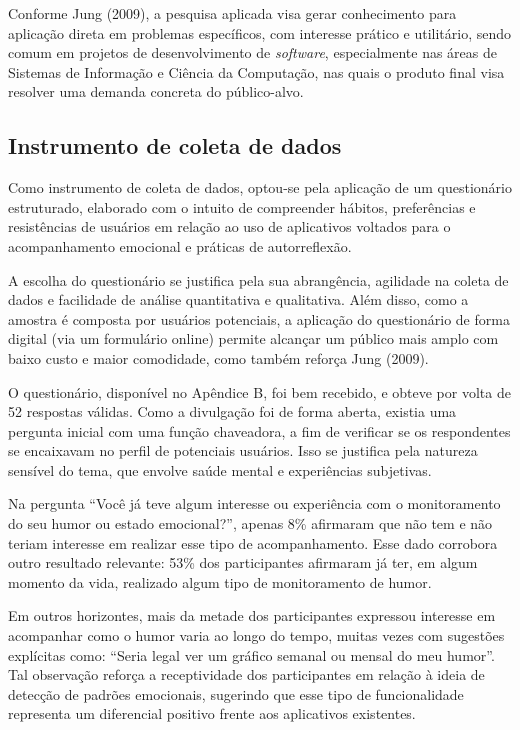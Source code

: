Conforme Jung (2009), a pesquisa aplicada visa gerar conhecimento para
aplicação direta em problemas específicos, com interesse prático e utilitário,
sendo comum em projetos de desenvolvimento de \textit{software}, especialmente
nas áreas de Sistemas de Informação e Ciência da Computação, nas quais o
produto final visa resolver uma demanda concreta do público-alvo.

\subsection{Instrumento de coleta de dados}

Como instrumento de coleta de dados, optou-se pela aplicação de um questionário
estruturado, elaborado com o intuito de compreender hábitos, preferências e
resistências de usuários em relação ao uso de aplicativos voltados para o
acompanhamento emocional e práticas de autorreflexão.

A escolha do questionário se justifica pela sua abrangência, agilidade na
coleta de dados e facilidade de análise quantitativa e qualitativa. Além disso,
como a amostra é composta por usuários potenciais, a aplicação do questionário
de forma digital (via um formulário online) permite alcançar um público mais
amplo com baixo custo e maior comodidade, como também reforça Jung (2009).

O questionário, disponível no Apêndice B, foi bem recebido, e obteve por volta
de 52 respostas válidas. Como a divulgação foi de forma aberta, existia uma
pergunta inicial com uma função chaveadora, a fim de verificar se os
respondentes se encaixavam no perfil de potenciais usuários. Isso se justifica
pela natureza sensível do tema, que envolve saúde mental e experiências
subjetivas.

Na pergunta ``Você já teve algum interesse ou experiência com o monitoramento do
seu humor ou estado emocional?'', apenas 8\% afirmaram que não tem e não teriam
interesse em realizar esse tipo de acompanhamento. Esse dado corrobora outro
resultado relevante: 53\% dos participantes afirmaram já ter, em algum momento
da vida, realizado algum tipo de monitoramento de humor.

Em outros horizontes, mais da metade dos participantes expressou interesse em
acompanhar como o humor varia ao longo do tempo, muitas vezes com sugestões
explícitas como: ``Seria legal ver um gráfico semanal ou mensal do meu humor''.
Tal observação reforça a receptividade dos participantes em relação à ideia de
detecção de padrões emocionais, sugerindo que esse tipo de funcionalidade
representa um diferencial positivo frente aos aplicativos existentes.


